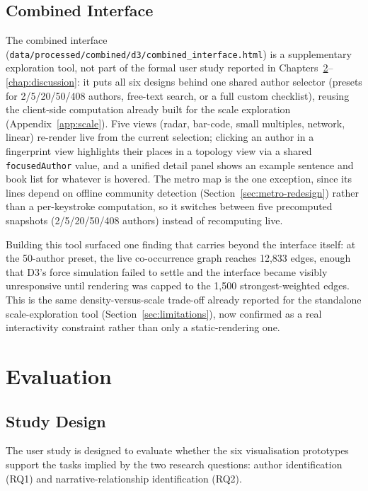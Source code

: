 \documentclass[logo,msc]{infthesis}
\begin{document}
\section{Combined Interface}
\label{sec:combined-interface}

The combined interface (\texttt{data/processed/combined/d3/combined\_interface.html}) is a supplementary exploration tool, not part of the formal user study reported in Chapters~\ref{chap:eval}--\ref{chap:discussion}: it puts all six designs behind one shared author selector (presets for 2/5/20/50/408 authors, free-text search, or a full custom checklist), reusing the client-side computation already built for the scale exploration (Appendix~\ref{app:scale}). Five views (radar, bar-code, small multiples, network, linear) re-render live from the current selection; clicking an author in a fingerprint view highlights their places in a topology view via a shared \texttt{focusedAuthor} value, and a unified detail panel shows an example sentence and book list for whatever is hovered. The metro map is the one exception, since its lines depend on offline community detection (Section~\ref{sec:metro-redesign}) rather than a per-keystroke computation, so it switches between five precomputed snapshots (2/5/20/50/408 authors) instead of recomputing live.

Building this tool surfaced one finding that carries beyond the interface itself: at the 50-author preset, the live co-occurrence graph reaches 12,833 edges, enough that D3's force simulation failed to settle and the interface became visibly unresponsive until rendering was capped to the 1,500 strongest-weighted edges. This is the same density-versus-scale trade-off already reported for the standalone scale-exploration tool (Section~\ref{sec:limitations}), now confirmed as a real interactivity constraint rather than only a static-rendering one.
 
\chapter{Evaluation}
\label{chap:eval}
 
\section{Study Design}
\label{sec:study-design}

The user study is designed to evaluate whether the six visualisation prototypes support the tasks implied by the two research questions: author identification (RQ1) and narrative-relationship identification (RQ2).
 
\end{document}
